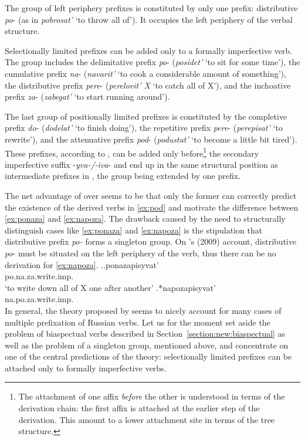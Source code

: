 The group of left periphery prefixes is constituted by only one prefix: distributive \textit{po}- (as in \textit{pobrosat'} `to throw all of'). It occupies the left periphery of the verbal structure.

Selectionally limited prefixes can be added only to a formally imperfective verb. The group includes the delimitative prefix \textit{po}- (\textit{posidet'} `to sit for some time'), the cumulative prefix \textit{na}- (\textit{navarit'} `to cook a considerable amount of something'), the distributive prefix \textit{pere}- (\textit{perelovit' X} `to catch all of X'), and the inchoative prefix \textit{za}- (\textit{zabegat'} `to start running around').

The last group of positionally limited prefixes is constituted by the completive prefix \textit{do}- (\textit{dodelat'} `to finish doing'), the repetitive prefix \textit{pere}- (\textit{perepisat'} `to rewrite'), and the attenuative prefix \textit{pod}- (\textit{podustat'} `to become a little bit tired'). These prefixes, according to \citet{Tatevosov:09}, can be added only before\footnote{The attachment of one affix \textit{before} the other is understood in terms of the derivation chain: the first affix is attached at the earlier step of the derivation. This amount to a lower attachment site in terms of the tree structure.} the secondary imperfective suffix -\textit{yva-/-iva}- and end up in the same structural position as intermediate prefixes in \citet{Tatevosov:07}, the group being extended by one prefix.
	
The net advantage of \citet{Tatevosov:09} over \citet{Tatevosov:07} seems to be that only the former can correctly predict the existence of the derived verbs in \ref{ex:pod} and motivate the difference between \ref{ex:ponaza} and \ref{ex:napoza}. The drawback caused by the need to structurally distinguish cases like \ref{ex:ponaza} and \ref{ex:napoza} is the stipulation that distributive prefix \textit{po-} forms a singleton group. On \citeauthor{Tatevosov:09}'s (2009) account, distributive \textit{po}- must be situated on the left periphery of the verb, thus there can be no derivation for \ref{ex:napoza}.
\ex.\ag.\label{ex:ponaza}ponazapisyvat'\\
po.na.za.write.imp.\\
`to write down all of X one after another'
\bg.\label{ex:napoza}*napozapisyvat'\\
na.po.za.write.imp.\\

In general, the theory proposed by \citet{Tatevosov:09} seems to nicely account for many cases of multiple prefixation of Russian verbs. Let us for the moment set aside the problem of biaspectual verbs described in Section~\ref{section:new:biaspectual} as well as the problem of a singleton group, mentioned above, and concentrate on one of the central predictions of the theory: selectionally limited prefixes can be attached only to formally imperfective verbs.

